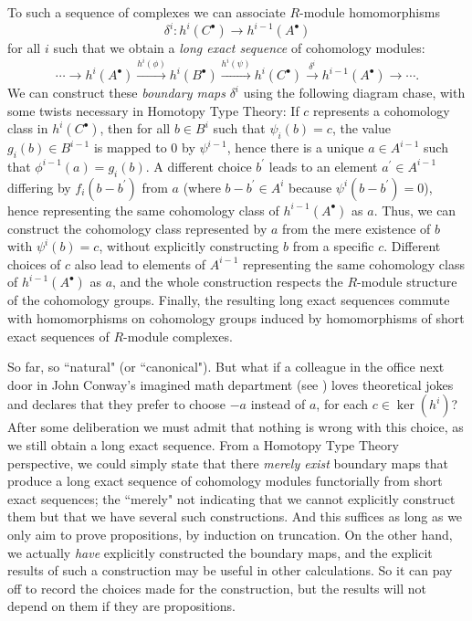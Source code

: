 \documentclass{amsart}
\theoremstyle{plain}
\numberwithin{equation}{section} %
\numberwithin{figure}{section} %
\theoremstyle{plain}
\theoremstyle{plain}
\theoremstyle{plain}
\theoremstyle{plain}
\theoremstyle{plain}
\theoremstyle{plain}
\theoremstyle{remark}
\theoremstyle{remark}
\theoremstyle{remark}
\begin{document}
To such a sequence of complexes we can associate $R$-module homomorphisms 
\[ \delta^i: h^i(C^\bullet) \rightarrow h^{i-1}(A^\bullet) \] 
for all $i$ such that we obtain a \textit{long exact sequence} of cohomology modules:
\[ \cdots \rightarrow h^i(A^\bullet) \stackrel{h^i(\phi)}{\rightarrow} h^i(B^\bullet) \stackrel{h^i(\psi)}{\rightarrow} h^i(C^\bullet) 
             \stackrel{\delta^i}{\rightarrow} h^{i-1}(A^\bullet) \rightarrow \cdots .\]
We can construct these \textit{boundary maps} $\delta^i$ using the following diagram chase, with some twists necessary in Homotopy Type Theory: If $c$ represents a cohomology class in $h^i(C^\bullet)$, then for all $b \in B^i$ such that $\psi_i(b) = c$, the value $g_i(b) \in B^{i-1}$ is mapped to $0$ by $\psi^{i-1}$, hence there is a unique $a \in A^{i-1}$ such that $\phi^{i-1}(a) = g_i(b)$. A different choice $b^\prime$ leads to an element $a^\prime \in A^{i-1}$ differing by $f_i(b - b^\prime)$ from $a$ (where $b - b^\prime \in A^i$ because $\psi^i(b-b^\prime) = 0$), hence representing the same cohomology class of $h^{i-1}(A^\bullet)$ as $a$. Thus, we can construct the cohomology class represented by $a$ from the mere existence of $b$ with $\psi^i(b) = c$, without explicitly constructing $b$ from a specific $c$. Different choices of $c$ also lead to elements of $A^{i-1}$ representing the same cohomology class of $h^{i-1}(A^\bullet)$ as $a$, and the whole construction respects the $R$-module structure of the cohomology groups. Finally, the resulting long exact sequences commute with homomorphisms on cohomology groups induced by homomorphisms of short exact sequences of $R$-module complexes. 

So far, so ``natural" (or  ``canonical"). But what if a colleague in the office next door in John Conway's imagined math department (see \cite[Sec.6]{Buz24}) loves theoretical jokes and declares that they prefer to choose $-a$ instead of $a$, for each $c \in \ker(h^i)$? After some deliberation we must admit that nothing is wrong with this choice, as we still obtain a long exact sequence. From a Homotopy Type Theory perspective, we could simply state that there \textit{merely exist} boundary maps that produce a long exact sequence of cohomology modules functorially from short exact sequences; the ``merely" not indicating that we cannot explicitly construct them but that we have several such constructions. And this suffices as long as we only aim to prove propositions, by induction on truncation. On the other hand, we actually \textit{have} explicitly constructed the boundary maps, and the explicit results of such a construction may be useful in other calculations. So it can pay off to record the choices made for the construction, but the results will not depend on them if they are propositions. 
\end{document}
